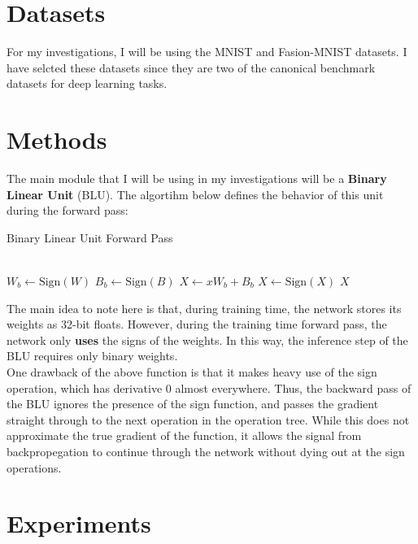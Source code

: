 \documentclass{article}
\begin{document}
  \section{Datasets}
    For my investigations, I will be using the MNIST \cite{mnist} and Fasion-MNIST \cite{fashionmnist} datasets. I have selcted these datasets since they are two of the canonical benchmark datasets for deep learning tasks.

  \section{Methods}
    The main module that I will be using in my investigations will be a \textbf{Binary Linear Unit} (BLU). The algortihm below defines the behavior of this unit during the forward pass:\\[6pt]

    \begin{algorithm}
      \caption{Binary Linear Unit Forward Pass}\label{BLUfp}
      \begin{algorithmic}
        \\
          \State $W_b \leftarrow \text{Sign}(W)$
          \State $B_b \leftarrow \text{Sign}(B)$
          \State $X \leftarrow xW_b + B_b$
          \State $X \leftarrow \text{Sign}(X)$
          \State \Return $X$
        \EndFunction
      \end{algorithmic}
    \end{algorithm}

    The main idea to note here is that, during training time, the network stores its weights as 32-bit floats.
    However, during the training time forward pass, the network only \textbf{uses} the signs of the weights.
    In this way, the inference step of the BLU requires only binary weights.\\[6pt]

    One drawback of the above function is that it makes heavy use of the sign operation, which has derivative 0 almost everywhere. Thus, the backward pass of the BLU ignores the presence of the sign function, and passes the gradient straight through to the next operation in the operation tree. While this does not approximate the true gradient of the function, it allows the signal from backpropegation to continue through the network without dying out at the sign operations.


  \section{Experiments}


  {}
  
\end{document}
